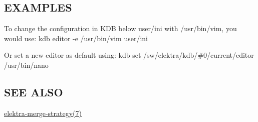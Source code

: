 \subsection*{E\+X\+A\+M\+P\+L\+E\+S}

To change the configuration in K\+D\+B below {\ttfamily user/ini} with {\ttfamily /usr/bin/vim}, you would use\+: {\ttfamily kdb editor -\/e /usr/bin/vim user/ini}

Or set a new editor as default using\+: {\ttfamily kdb set /sw/elektra/kdb/\#0/current/editor /usr/bin/nano}

\subsection*{S\+E\+E A\+L\+S\+O}


\begin{DoxyItemize}
\item \hyperlink{md_doc_help_elektra-merge-strategy_doc_help_elektra-merge-strategy_md}{elektra-\/merge-\/strategy(7)} 
\end{DoxyItemize}